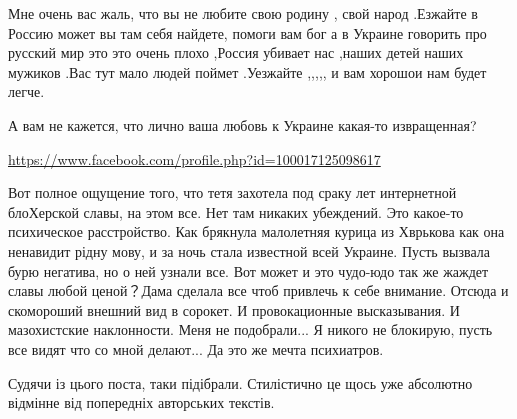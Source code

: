 \begin{itemize}
Мне очень вас жаль, что вы не любите свою родину , свой народ .Езжайте в Россию
может вы там себя найдете, помоги вам бог а в Украине говорить про русский мир
это это очень плохо ,Россия убивает нас ,наших детей наших мужиков .Вас тут
мало людей поймет .Уезжайте ,,,,, и вам хорошои нам будет легче.

\begin{itemize}
 
А вам не кажется, что лично ваша любовь к Украине какая-то извращенная?
\end{itemize}

\url{https://www.facebook.com/profile.php?id=100017125098617}\par
 

Вот полное ощущение того, что тетя захотела под сраку лет интернетной
блоХерской славы, на этом все. Нет там никаких убеждений. Это какое-то
психическое расстройство. Как брякнула малолетняя курица из Хврькова как она
ненавидит рідну мову, и за ночь стала известной всей Украине. Пусть вызвала
бурю негатива, но о ней узнали все. Вот может и это чудо-юдо так же жаждет
славы любой ценой？Дама сделала все чтоб привлечь к себе внимание. Отсюда и
скомороший внешний вид в сорокет. И провокационные высказывания. И мазохистские
наклонности. Меня не подобрали... Я никого не блокирую, пусть все видят что со
мной делают... Да это же мечта психиатров.

\begin{itemize}
 
Судячи із цього поста, таки підібрали. Стилістично це щось уже абсолютно відмінне від попередніх авторських текстів.

 

\end{itemize}
\end{itemize}
